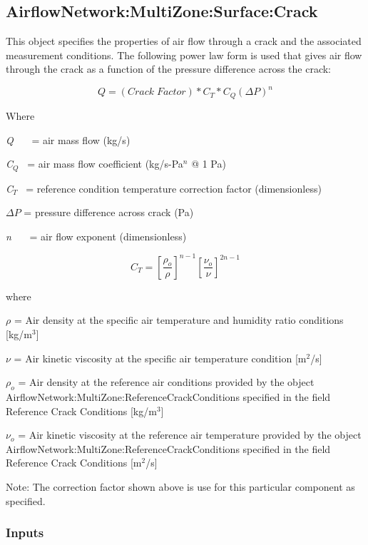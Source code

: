 \subsection{AirflowNetwork:MultiZone:Surface:Crack}\label{airflownetworkmultizonesurfacecrack}

This object specifies the properties of air flow through a crack and the associated measurement conditions. The following power law form is used that gives air flow through the crack as a function of the pressure difference across the crack:

\begin{equation}
Q = \left( Crack\;Factor \right) * C_T * C_Q \left( \Delta P \right)^{n}
\end{equation}

Where

\emph{Q}~~~ = air mass flow (kg/s)

\emph{C\(_{Q}\)}~ = air mass flow coefficient (kg/s-Pa\(^{n}\) @ 1 Pa)

\emph{C\(_{T}\)}~ = reference condition temperature correction factor (dimensionless)

\(\Delta P\) = pressure difference across crack (Pa)

\emph{n}~~~ = air flow exponent (dimensionless)

\begin{equation}
{C_T} = {\left[ {\frac{{{\rho_o}}}{\rho }} \right]^{n - 1}}{\left[ {\frac{{{\nu_o}}}{\nu }} \right]^{2n - 1}}
\end{equation}

where

\(\rho\) = Air density at the specific air temperature and humidity ratio conditions {[}kg/m\(^{3}\){]}

\(\nu\) = Air kinetic viscosity at the specific air temperature condition {[}m\(^{2}\)/s{]}

\(\rho_o\) = Air density at the reference air conditions provided by the object Air\-flow\-Net\-work:\-Multi\-Zone:\-Refer\-ence\-Crack\-Con\-ditions specified in the field Reference Crack Conditions {[}kg/m\(^{3}\){]}

\(\nu_o\) = Air kinetic viscosity at the reference air temperature provided by the object Air\-flow\-Net\-work:\-Multi\-Zone:\-Refer\-ence\-Crack\-Con\-ditions specified in the field Reference Crack Conditions {[}m\(^{2}\)/s{]}

Note: The correction factor shown above is use for this particular component as specified.

\subsubsection{Inputs}\label{inputs-2-004}

